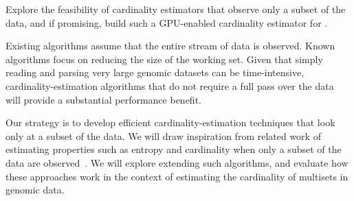 \begin{rproblem}
Explore the feasibility of cardinality estimators that observe only a  subset of the data, and if promising, build such a GPU-enabled cardinality estimator for \kmers.
\end{rproblem}

Existing algorithms assume that the entire stream of data is observed.  Known algorithms focus on reducing the size of the working set.  Given that simply reading and parsing very large genomic datasets can be time-intensive, cardinality-estimation algorithms that do not require a full pass over the data will provide a substantial performance benefit.


Our strategy is to develop efficient cardinality-estimation techniques that look only at a subset of the data. 
We will draw inspiration from related work of estimating properties such as entropy and cardinality when only a subset of the data are observed~\cite{valiant2017estimating}.  We will explore extending such algorithms, and evaluate how these approaches work in the context of estimating the cardinality of \kmer multisets in genomic data.  
